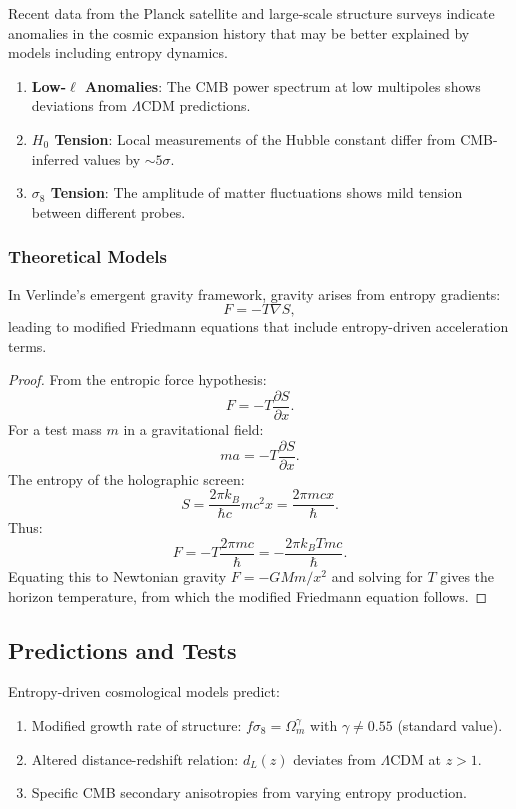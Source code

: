 \begin{proposition}
Recent data from the Planck satellite and large-scale structure surveys indicate anomalies in the cosmic expansion history that may be better explained by models including entropy dynamics.
\end{proposition}

\begin{enumerate}
\item \textbf{Low-$\ell$ Anomalies}: The CMB power spectrum at low multipoles shows deviations from $\Lambda$CDM predictions.
\item \textbf{$H_0$ Tension}: Local measurements of the Hubble constant differ from CMB-inferred values by $\sim 5\sigma$.
\item \textbf{$\sigma_8$ Tension}: The amplitude of matter fluctuations shows mild tension between different probes.
\end{enumerate}

\subsubsection{Theoretical Models}

\begin{theorem}
In Verlinde's emergent gravity framework, gravity arises from entropy gradients:
\[
F = -T \nabla S,
\]
leading to modified Friedmann equations that include entropy-driven acceleration terms.
\end{theorem}

\begin{proof}
From the entropic force hypothesis:
\[
F = -T \frac{\partial S}{\partial x}.
\]
For a test mass $m$ in a gravitational field:
\[
ma = -T \frac{\partial S}{\partial x}.
\]
The entropy of the holographic screen:
\[
S = \frac{2\pi k_B}{\hbar c} m c^2 x = \frac{2\pi m c x}{\hbar}.
\]
Thus:
\[
F = -T \frac{2\pi m c}{\hbar} = -\frac{2\pi k_B T m c}{\hbar}.
\]
Equating this to Newtonian gravity $F = -GMm/x^2$ and solving for $T$ gives the horizon temperature, from which the modified Friedmann equation follows.
\end{proof}

\subsection{Predictions and Tests}

\begin{proposition}
Entropy-driven cosmological models predict:
\begin{enumerate}
\item Modified growth rate of structure: $f\sigma_8 = \Omega_m^{\gamma}$ with $\gamma \neq 0.55$ (standard value).
\item Altered distance-redshift relation: $d_L(z)$ deviates from $\Lambda$CDM at $z > 1$.
\item Specific CMB secondary anisotropies from varying entropy production.
\end{enumerate}
\end{proposition}

